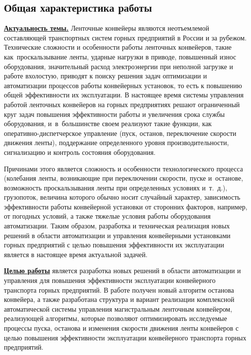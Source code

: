 \subsection*{\Large Общая характеристика работы}
\fontsize{14pt}{15pt}\selectfont
\underline{\textbf{Актуальность темы.}} Ленточные конвейеры являются неотъемлемой составляющей транспортных систем горных предприятий в России и за рубежом.
Технические сложности и особенности работы ленточных конвейеров, такие как~проскальзывание ленты, ударные нагрузки в приводе, повышенный износ оборудования, значительный расход электроэнергии при неполной загрузке и работе вхолостую, приводят к поиску решения задач оптимизации и автоматизации процессов работы конвейерных установок, то есть к повышению общей эффективности их эксплуатации. В настоящее время системы управления работой ленточных конвейеров на горных предприятиях решают ограниченный круг задач повышения эффективности работы и увеличения срока службы оборудования, и~в~большинстве своем реализуют такие функции, как оперативно-диспетчерское управление (пуск, останов, переключение скорости движения ленты), поддержание определенного уровня производительности, сигнализацию и контроль состояния оборудования.

Причинами этого является сложность и особенности технологического процесса (колебания ленты, возникающие при переключении скорости, пуске и~останове, возможность проскальзывания ленты при определенных условиях и~т.~д.), грузопоток, величина которого обычно носит случайный характер, зависимость эффективности работы конвейерной установки от сторонних факторов, например, от погодных условий, а также тяжелые условия работы оборудования автоматизации. Таким образом, разработка и техническая реализация новых решений в области автоматизации и управления конвейерными установками горных предприятий с целью повышения эффективности их эксплуатации является в настоящее время актуальной задачей.
\bigskip

\underline{\textbf{Целью работы}} является разработка новых решений в области автоматизации и управления для повышения эффективности эксплуатации конвейерного транспорта горных предприятий. В работе получен новый алгоритм останова конвейера, а также разработана структура и вариант реализации комплексной автоматической системы управления магистральным ленточным конвейером, реализующей алгоритмы, которые позволяют оптимизировать исследуемые процессы пуска, останова и изменения скорости движения ленты конвейеров с целью повышения эффективности эксплуатации конвейерного транспорта горных предприятий.
\bigskip

